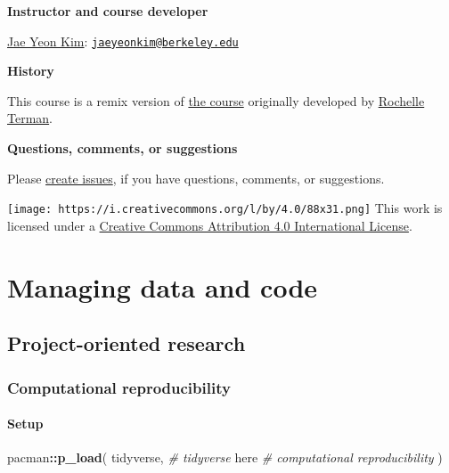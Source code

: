 \documentclass[
]{book}
\newenvironment{Shaded}{\begin{snugshade}}{\end{snugshade}}
\newcommand{\CommentTok}[1]{\textcolor[rgb]{0.56,0.35,0.01}{\textit{#1}}}
\newcommand{\KeywordTok}[1]{\textcolor[rgb]{0.13,0.29,0.53}{\textbf{#1}}}
\newcommand{\NormalTok}[1]{#1}
\newcommand{\OperatorTok}[1]{\textcolor[rgb]{0.81,0.36,0.00}{\textbf{#1}}}
\begin{document}
\textbf{Instructor and course developer}

\href{https://jaeyk.github.io/}{Jae Yeon Kim}: \href{mailto:jaeyeonkim@berkeley.edu}{\nolinkurl{jaeyeonkim@berkeley.edu}}

\textbf{History}

This course is a remix version of \href{https://github.com/rochelleterman/PS239T}{the course} originally developed by \href{https://github.com/rochelleterman}{Rochelle Terman}.

\textbf{Questions, comments, or suggestions}

Please \href{https://github.com/jaeyk/PS239T/issues}{create issues}, if you have questions, comments, or suggestions.

\texttt{[image: https://i.creativecommons.org/l/by/4.0/88x31.png]} This work is licensed under a \href{https://creativecommons.org/licenses/by/4.0/}{Creative Commons Attribution 4.0 International License}.

\hypertarget{Intro}{%
\chapter{Managing data and code}\label{Intro}}

\hypertarget{project-oriented-research}{%
\section{Project-oriented research}\label{project-oriented-research}}

\hypertarget{computational-reproducibility}{%
\subsection{Computational reproducibility}\label{computational-reproducibility}}

\hypertarget{setup}{%
\subsubsection{Setup}\label{setup}}

\begin{Shaded}
\begin{Highlighting}[]
\NormalTok{pacman}\OperatorTok{::}\KeywordTok{p\_load}\NormalTok{(}
\NormalTok{  tidyverse, }\CommentTok{\# tidyverse}
\NormalTok{  here }\CommentTok{\# computational reproducibility}
\NormalTok{)}
\end{Highlighting}
\end{Shaded}
\end{document}
